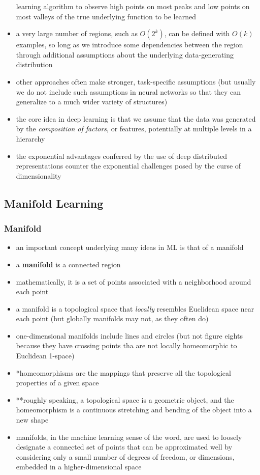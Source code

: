 \documentclass[11pt, twocolumn]{report}
\begin{document}
\begin{itemize}
    learning algorithm to observe high points on most peaks and low points on
    most valleys of the true underlying function to be learned
  \item a very large number of regions, such as $O(2^k)$, can be defined with
    $O(k)$ examples, so long as we introduce some dependencies between the
    region through additional assumptions about the underlying data-generating
    distribution
  \item other approaches often make stronger, task-specific assumptions (but
    usually we do not include such assumptions in neural networks so that they
    can generalize to a much wider variety of structures)
  \item the core idea in deep learning is that we assume that the data was
    generated by the \textit{composition of factors}, or features, potentially
    at multiple levels in a hierarchy
  \item the exponential advantages conferred by the use of deep distributed
    representations counter the exponential challenges posed by the curse of
    dimensionality
\end{itemize}

\subsection{Manifold Learning}
\subsubsection{Manifold}
\begin{itemize}
  \item an important concept underlying many ideas in ML is that of a manifold
  \item a \textbf{manifold} is a connected region
  \item mathematically, it is a set of points associated with a neighborhood
    around each point
  \item a manifold is a topological space that \textit{locally} resembles
    Euclidean space near each point (but globally manifolds may not, as they
    often do)
  \item one-dimensional manifolds include lines and circles (but not figure
    eights because they have crossing points tha are not locally homeomorphic
    to Euclidean 1-space)
  \item *homeomorphisms are the mappings that preserve all the topological
    properties of a given space
  \item **roughly speaking, a topological space is a geometric object, and the
    homeomorphism is a continuous stretching and bending of the object into
    a new shape
  \item manifolds, in the machine learning sense of the word, are used to
    loosely designate a connected set of points that can be approximated well by
    considering only a small number of degrees of freedom, or dimensions,
    embedded in a higher-dimensional space
\end{itemize}
\end{document}
